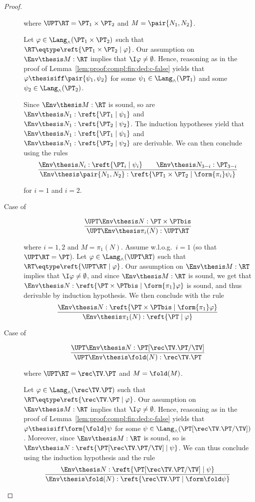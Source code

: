 \begin{proof}
\begin{description}
\noindent
where $\UPT\RT = \PT_1 \times \PT_2$
and $M = \pair{N_1,N_2}$.

Let $\varphi \in \Lang_\land(\PT_1 \times \PT_2)$
such that $\RT \eqtype \reft{\PT_1 \times \PT_2 \mid \varphi}$.
Our assumption on $\Env \thesis M : \RT$
implies that $\I\varphi \neq \emptyset$.
Hence,
reasoning as in the proof of Lemma~\ref{lem:proof:compl:fin:ded:c-false}
yields that $\varphi \thesisiff \pair{\psi_1,\psi_2}$
for some $\psi_1 \in \Lang_\land(\PT_1)$
and some $\psi_2 \in \Lang_\land(\PT_2)$.

Since $\Env \thesis M :\RT$ is sound,
so are
$\Env \thesis N_1 : \reft{\PT_1 \mid \psi_1}$
and
$\Env \thesis N_1 : \reft{\PT_2 \mid \psi_2}$.
The induction hypotheses yield that
$\Env \thesis N_1 : \reft{\PT_1 \mid \psi_1}$
and
$\Env \thesis N_1 : \reft{\PT_2 \mid \psi_2}$
are derivable.
We can then conclude using the rules
\[
\dfrac{\Env \thesis N_i : \reft{\PT_i \mid \psi_i}
  \qquad
  \Env \thesis N_{3-i} : \PT_{3-i}}
  {\Env \thesis \pair{N_1,N_2} : \reft{\PT_1 \times \PT_2 \mid \form{\pi_i} \psi_i}}
\]

\noindent
for $i = 1$ and $i = 2$.

\item[Case of]
\[
\begin{array}{c}
\dfrac{\UPT\Env \thesis N : \PT \times \PTbis}
  {\UPT\Env \thesis \pi_i(N) : \UPT\RT}
\end{array}
\]

\noindent
where $i = 1,2$ and $M = \pi_1(N)$.
Assume w.l.o.g.\ $i = 1$ (so that $\UPT\RT = \PT$).
Let $\varphi \in \Lang_\land(\UPT\RT)$ such that
$\RT \eqtype \reft{\UPT\RT \mid \varphi}$.
Our assumption on $\Env \thesis M : \RT$
implies that $\I\varphi \neq \emptyset$,
and
since $\Env \thesis M : \RT$ is sound,
we get that
$\Env \thesis N : \reft{\PT \times \PTbis \mid \form{\pi_1}\varphi}$
is sound, and thus derivable by induction hypothesis.
We then conclude with the rule
\[
\dfrac{\Env \thesis N : \reft{\PT \times \PTbis \mid \form{\pi_1} \varphi}}
  {\Env \thesis \pi_1(N) : \reft{\PT \mid \varphi}}
\]

\item[Case of]
\[
\dfrac{\UPT\Env \thesis N : \PT[\rec\TV.\PT/\TV]}
  {\UPT\Env \thesis \fold(N) : \rec\TV.\PT}
\]

\noindent
where $\UPT\RT = \rec\TV.\PT$ and $M = \fold(M)$.

Let $\varphi \in \Lang_\land(\rec\TV.\PT)$
such that $\RT \eqtype \reft{ \rec\TV.\PT \mid \varphi}$.
Our assumption on $\Env \thesis M : \RT$
implies that $\I\varphi \neq \emptyset$.
Hence,
reasoning as in the proof of Lemma~\ref{lem:proof:compl:fin:ded:c-false}
yields that $\varphi \thesisiff \form{\fold}\psi$
for some $\psi \in \Lang_\land(\PT[\rec\TV.\PT/\TV])$.
Moreover, since $\Env \thesis M : \RT$ is sound,
so is
$\Env \thesis N : \reft{\PT[\rec\TV.\PT/\TV] \mid \psi}$.
We can thus conclude using the induction hypothesis and the rule
\[
\dfrac{\Env \thesis N : \reft{\PT[\rec\TV.\PT/\TV] \mid \psi}}
  {\Env \thesis \fold(N) : \reft{\rec\TV.\PT \mid \form\fold \psi}}
\]



\end{description}
\end{proof}

